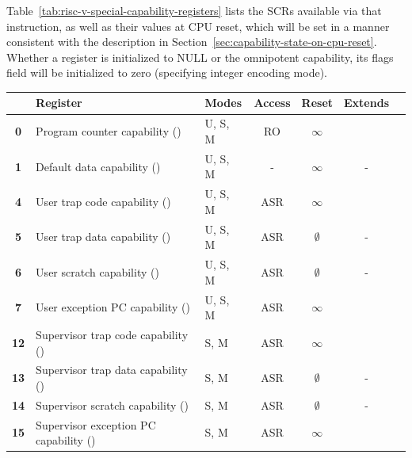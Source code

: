 Table~\ref{tab:risc-v-special-capability-registers} lists the SCRs
available via that instruction, as well as their values at CPU reset, which
will be set in a manner consistent with the description in
Section~\ref{sec:capability-state-on-cpu-reset}.
Whether a register is initialized to NULL or the omnipotent capability, its
flags field will be initialized to zero (specifying integer encoding mode).


\begin{table}[h!]
\centering
\begin{tabular}{cllcccc@{}}
\toprule
& \textbf{Register} & \textbf{Modes} & \textbf{Access} & \textbf{Reset} & \textbf{Extends} \\ \midrule
\textbf{0} & Program counter capability (\PCC{})     & U, S, M & RO & $\infty$ & \PC{} \\
\textbf{1} & Default data capability (\DDC{})        & U, S, M & -  & $\infty$ & -     \\
[1.5em]
\textbf{4} & User trap code capability (\UTCC{})     & U, S, M & ASR & $\infty$    & \utvec{} \\
\textbf{5} & User trap data capability (\UTDC{})     & U, S, M & ASR & $\emptyset$ & -        \\
\textbf{6} & User scratch capability (\UScratchC{})  & U, S, M & ASR & $\emptyset$ & -        \\
\textbf{7} & User exception PC capability (\UEPCC{}) & U, S, M & ASR & $\infty$    & \uepc{} \\
[1.5em]

\textbf{12} & Supervisor trap code capability (\STCC{})     & S, M & ASR & $\infty$    & \stvec{} \\
\textbf{13} & Supervisor trap data capability (\STDC{})     & S, M & ASR & $\emptyset$ & -        \\
\textbf{14} & Supervisor scratch capability (\SScratchC{})  & S, M & ASR & $\emptyset$ & -        \\
\textbf{15} & Supervisor exception PC capability (\SEPCC{}) & S, M & ASR & $\infty$    & \sepc{}  \\
[1.5em]


\end{tabular}
\end{table}
